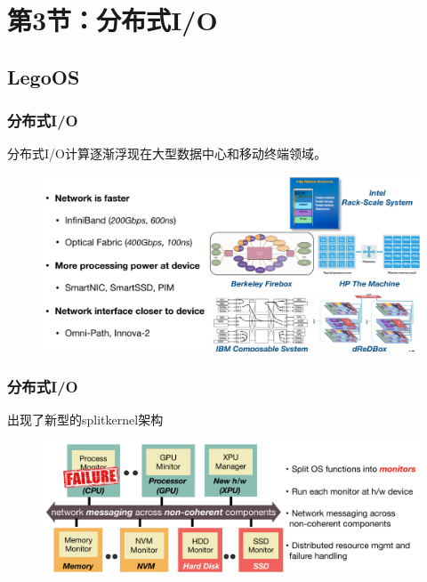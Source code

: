 \section{第3节：分布式I/O} %
\subsection{LegoOS} %
\begin{frame}[fragile]
    \frametitle{分布式I/O}
    分布式I/O计算逐渐浮现在大型数据中心和移动终端领域。
  
   
    
        \begin{figure}
        \includegraphics[width=0.9\linewidth]{figs/disio-current.png}
        \end{figure}
\end{frame}

\begin{frame}[fragile]
    \frametitle{分布式I/O}
    出现了新型的splitkernel架构
    
    
    
    \begin{figure}
        \includegraphics[width=0.9\linewidth]{figs/disio-splitkernel.png}
    \end{figure}
\end{frame}


